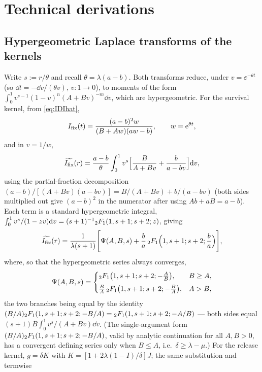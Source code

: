 
\section{Technical derivations}
\label{app:technical}

\subsection{Hypergeometric Laplace transforms of the kernels}
\label{app:transforms}

Write $s:=r/\theta$ and recall $\theta=\lambda(a-b)$. Both transforms reduce,
under $v=\ee^{-\theta t}$ (so $\dd t=-\dd v/(\theta v)$, $v:1\to0$), to
moments of the form $\int_0^1 v^{s-1}(1-v)^n(A+Bv)^{-m}\dd v$, which are
hypergeometric. For the survival kernel, from \eqref{eq:IDIhat},
$$
I_{\mathrm{fix}}(t)=\frac{(a-b)^2w}{(B+Aw)(aw-b)},\qquad w={\rm e}^{\theta t},
$$
and in $v=1/w$,
$$
\widetilde{I_{\mathrm{fix}}}(r)=\frac{a-b}{\theta}\int_0^1 v^s
\Bigl[\frac{B}{A+Bv}+\frac{b}{a-bv}\Bigr]{\rm d} v,
$$
using the partial-fraction decomposition
$(a-b)/[(A+Bv)(a-bv)]=B/(A+Bv)+b/(a-bv)$ (both sides multiplied out give
$(a-b)^2$ in the numerator after using $Ab+aB=a-b$). Each term is a
standard hypergeometric integral,
$\int_0^1 v^s/(1-zv){\rm d} v=(s+1)^{-1}{}_2F_1(1,s+1;s+2;z)$, giving
\begin{equation}
\widetilde{I_{\mathrm{fix}}}(r)=\frac{1}{\lambda(s+1)}
\Biggl[
\Psi(A,B,s)
+\frac{b}{a}\,{}_2F_1\Bigl(1,s+1;s+2;\frac{b}{a}\Bigr)
\Biggr],
\label{eq:LIhat}
\end{equation}
where, so that the hypergeometric series always converges,
\begin{equation}
\Psi(A,B,s)=
\begin{cases}
{}_2F_1\bigl(1,s+1;s+2;-\frac{A}{B}\bigr), & B\ge A,\\[0.4em]
\frac{B}{A}\,{}_2F_1\bigl(1,s+1;s+2;-\frac{B}{A}\bigr), & A>B,
\end{cases}
\end{equation}
the two branches being equal by the identity
$(B/A){}_2F_1(1,s+1;s+2;-B/A)={}_2F_1(1,s+1;s+2;-A/B)$ --- both sides equal
$(s+1)B\int_0^1 v^s/(A+Bv)\dd v$. (The single-argument form
$(B/A){}_2F_1(1,s+1;s+2;-B/A)$, valid by analytic continuation for all
$A,B>0$, has a convergent defining series only when $B\le A$, i.e.\
$\delta\ge\lambda-\mu$.) For the release kernel, $g=\delta K$ with
$K=[1+2\lambda(1-I)/\delta]J$; the same substitution and termwise
